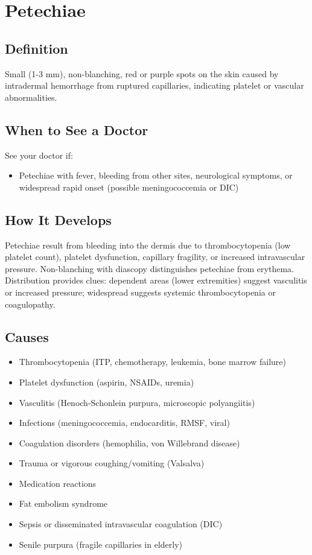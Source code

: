 \chapter{Petechiae}

\section*{Definition}
Small (1-3 mm), non-blanching, red or purple spots on the skin caused by intradermal hemorrhage from ruptured capillaries, indicating platelet or vascular abnormalities.

\section*{When to See a Doctor}
See your doctor if:
\begin{itemize}
  \item Petechiae with fever, bleeding from other sites, neurological symptoms, or widespread rapid onset (possible meningococcemia or DIC)
\end{itemize}

\section*{How It Develops}
Petechiae result from bleeding into the dermis due to thrombocytopenia (low platelet count), platelet dysfunction, capillary fragility, or increased intravascular pressure. Non-blanching with diascopy distinguishes petechiae from erythema. Distribution provides clues: dependent areas (lower extremities) suggest vasculitis or increased pressure; widespread suggests systemic thrombocytopenia or coagulopathy.

\section*{Causes}
\begin{itemize}
  \item Thrombocytopenia (ITP, chemotherapy, leukemia, bone marrow failure)
  \item Platelet dysfunction (aspirin, NSAIDs, uremia)
  \item Vasculitis (Henoch-Schonlein purpura, microscopic polyangiitis)
  \item Infections (meningococcemia, endocarditis, RMSF, viral)
  \item Coagulation disorders (hemophilia, von Willebrand disease)
  \item Trauma or vigorous coughing/vomiting (Valsalva)
  \item Medication reactions
  \item Fat embolism syndrome
  \item Sepsis or disseminated intravascular coagulation (DIC)
  \item Senile purpura (fragile capillaries in elderly)
\end{itemize}

